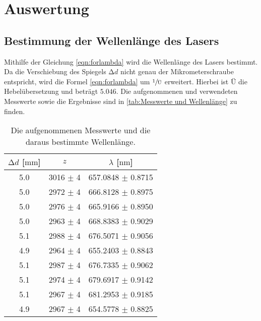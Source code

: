 \section{Auswertung}
\label{sec:Auswertung}

\subsection{Bestimmung der Wellenlänge des Lasers}
\label{subsec:Wellenlänge}

Mithilfe der Gleichung \eqref{eqn:forlambda} wird die Wellenlänge des Lasers bestimmt.
Da die Verschiebung des Spiegels $\increment d$ nicht genau der Mikrometerschraube entspricht, wird die Formel \eqref{eqn:forlambda} um $\sfrac{1}{\text{Ü}}$ erweitert.
Hierbei ist $\text{Ü}$ die Hebelübersetzung und beträgt $5.046$.
Die aufgenommenen und verwendeten Messwerte sowie die Ergebnisse sind in \autoref{tab:Messwerte und Wellenlänge} zu finden.

\begin{table}
  \centering
  \caption{Die aufgenommenen Messwerte und die daraus bestimmte Wellenlänge.}
  \label{tab:Messwerte und Wellenlänge}
  \begin{tabular}{c c c}
    \toprule
    {$\increment d$ [$\si{\milli\metre}$]} & {$z$} & {$\lambda$ [$\si{\nano\metre}$]} \\
    \midrule
    5.0     &       3016 $\pm$ 4    &   657.0848 $\pm$ 0.8715\\
    5.0     &       2972 $\pm$ 4    &   666.8128 $\pm$ 0.8975\\
    5.0     &       2976 $\pm$ 4    &   665.9166 $\pm$ 0.8950\\
    5.0     &       2963 $\pm$ 4    &   668.8383 $\pm$ 0.9029\\
    5.1     &       2988 $\pm$ 4    &   676.5071 $\pm$ 0.9056\\
    4.9     &       2964 $\pm$ 4    &   655.2403 $\pm$ 0.8843\\
    5.1     &       2987 $\pm$ 4    &   676.7335 $\pm$ 0.9062\\
    5.1     &       2974 $\pm$ 4    &   679.6917 $\pm$ 0.9142\\
    5.1     &       2967 $\pm$ 4    &   681.2953 $\pm$ 0.9185\\
    4.9     &       2967 $\pm$ 4    &   654.5778 $\pm$ 0.8825\\
    \bottomrule
  \end{tabular}
\end{table}

